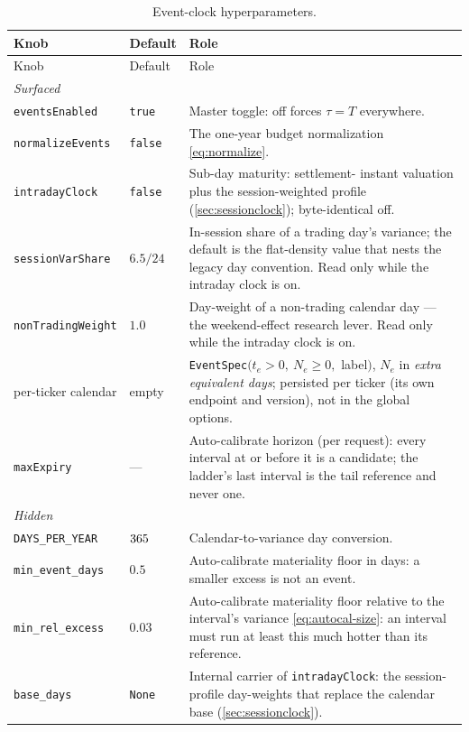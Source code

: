 \documentclass[11pt]{article}
\begin{document}
\begin{longtable}{p{}p{}p{}}
\caption{Event-clock hyperparameters.}\label{tab:atlas}\\
\toprule Knob & Default & Role\\ \midrule
\endfirsthead \toprule Knob & Default & Role\\ \midrule \endhead
\multicolumn{3}{l}{\emph{Surfaced}}\\ \midrule
\texttt{eventsEnabled} & \texttt{true} & Master toggle: off forces
$\tau=T$ everywhere.\\
\texttt{normalizeEvents} & \texttt{false} & The one-year budget
normalization \eqref{eq:normalize}.\\
\texttt{intradayClock} & \texttt{false} & Sub-day maturity: settlement-
instant valuation plus the session-weighted profile
(\cref{sec:sessionclock}); byte-identical off.\\
\texttt{sessionVarShare} & $6.5/24$ & In-session share of a trading
day's variance; the default is the flat-density value that nests the
legacy day convention.  Read only while the intraday clock is on.\\
\texttt{nonTradingWeight} & $1.0$ & Day-weight of a non-trading calendar
day --- the weekend-effect research lever.  Read only while the intraday
clock is on.\\
per-ticker calendar & empty & \texttt{EventSpec}$(t_e>0,\ N_e\ge0,$
label$)$, $N_e$ in \emph{extra equivalent days}; persisted per ticker
(its own endpoint and version), not in the global options.\\
\texttt{maxExpiry} & --- & Auto-calibrate horizon (per request): every
interval at or before it is a candidate; the ladder's last interval is
the tail reference and never one.\\
\midrule
\multicolumn{3}{l}{\emph{Hidden}}\\ \midrule
\texttt{DAYS\_PER\_YEAR} & $365$ & Calendar-to-variance day
conversion.\\
\texttt{min\_event\_days} & $0.5$ & Auto-calibrate materiality floor in
days: a smaller excess is not an event.\\
\texttt{min\_rel\_excess} & $0.03$ & Auto-calibrate materiality floor
relative to the interval's variance \eqref{eq:autocal-size}: an interval
must run at least this much hotter than its reference.\\
\texttt{base\_days} & \texttt{None} & Internal carrier of
\texttt{intradayClock}: the session-profile day-weights that replace the
calendar base (\cref{sec:sessionclock}).\\
\bottomrule
\end{longtable}
\end{document}
